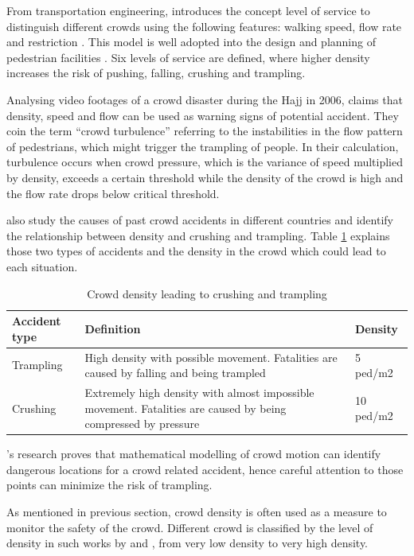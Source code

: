 From transportation engineering, \citet{Fruin1970} introduces the concept level of service to distinguish different crowds using the following features: walking speed, flow rate and restriction \citep{Challenger2009}. This model is well adopted into the design and planning of pedestrian facilities \citep{Shiwakoti2008,Ye2008}. Six levels of service are defined, where higher density increases the risk of pushing, falling, crushing and trampling.

Analysing video footages of a crowd disaster during the Hajj in 2006, \citet{Helbing2007} claims that density, speed and flow can be used as warning signs of potential accident. They coin the term ``crowd turbulence'' referring to the instabilities in the flow pattern of pedestrians, which might trigger the trampling of people. In their calculation, turbulence occurs when crowd pressure, which is the variance of speed multiplied by density, exceeds a certain threshold while the density of the crowd is high and the flow rate drops below critical threshold.

\citet{Lee2005} also study the causes of past crowd accidents in different countries and identify the relationship between density and crushing and trampling. Table \ref{table:densityCrushingTrampling} explains those two types of accidents and the density in the crowd which could lead to each situation.

\begin{table}
	\caption{Crowd density leading to crushing and trampling}
	\label{table:densityCrushingTrampling}
	\centering
	\begin{tabular}{|l|p{9.5cm}|l|}
		\hline
		\textbf{Accident type} & \textbf{Definition} & \textbf{Density} \\
		\hline
		Trampling & High density with possible movement. Fatalities are caused by falling and being trampled & 5 ped/m2 \\
		\hline
		Crushing & Extremely high density with almost impossible movement. Fatalities are caused by being compressed by pressure & 10 ped/m2 \\
		\hline
	\end{tabular}
\end{table}

\citet{Lee2005}’s research proves that mathematical modelling of crowd motion can identify dangerous locations for a crowd related accident, hence careful attention to those points can minimize the risk of trampling.

As mentioned in previous section, crowd density is often used as a measure to monitor the safety of the crowd. Different crowd is classified by the level of density in such works by \citet{Marana1997} and \citet{Weppner2013}, from very low density to very high density.

